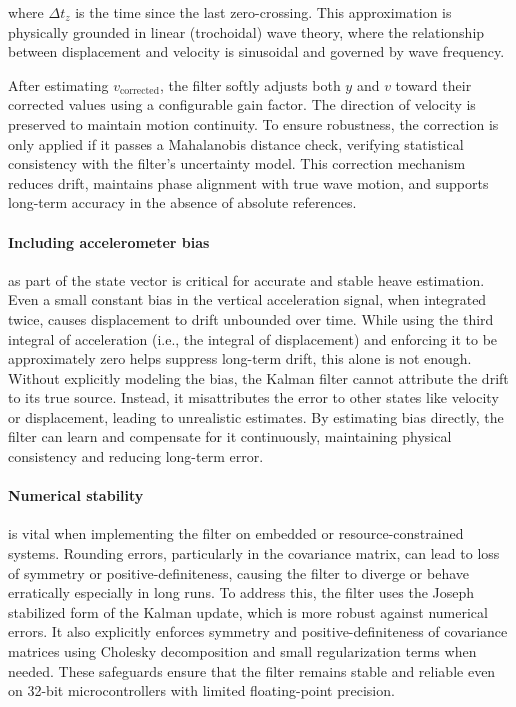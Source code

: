 \documentclass[11pt,letterpaper]{article}
\begin{document}
where \( \Delta t_{z} \) is the time since the last zero-crossing. This approximation is physically grounded in linear (trochoidal) wave theory\cite{Clamond2007,Gerstner1809}, where the relationship between displacement and velocity is sinusoidal and governed by wave frequency.

After estimating \( v_{\text{corrected}} \), the filter softly adjusts both \( y \) and \( v \) toward their corrected values using a configurable gain factor. The direction of velocity is preserved to maintain motion continuity. To ensure robustness, the correction is only applied if it passes a Mahalanobis distance check, verifying statistical consistency with the filter's uncertainty model. This correction mechanism reduces drift, maintains phase alignment with true wave motion, and supports long-term accuracy in the absence of absolute references.

\paragraph{Including accelerometer bias}
as part of the state vector is critical for accurate and stable heave estimation. Even a small constant bias in the vertical acceleration signal, when integrated twice, causes displacement to drift unbounded over time. While using the third integral of acceleration (i.e., the integral of displacement) and enforcing it to be approximately zero helps suppress long-term drift, this alone is not enough. Without explicitly modeling the bias, the Kalman filter cannot attribute the drift to its true source. Instead, it misattributes the error to other states like velocity or displacement, leading to unrealistic estimates. By estimating bias directly, the filter can learn and compensate for it continuously, maintaining physical consistency and reducing long-term error.

\paragraph{Numerical stability}
is vital when implementing the filter on embedded or resource-constrained systems. Rounding errors, particularly in the covariance matrix, can lead to loss of symmetry or positive-definiteness, causing the filter to diverge or behave erratically especially in long runs. To address this, the filter uses the Joseph\cite{grewal2014kalman} stabilized form of the Kalman update, which is more robust against numerical errors. It also explicitly enforces symmetry and positive-definiteness of covariance matrices using Cholesky decomposition and small regularization terms when needed. These safeguards ensure that the filter remains stable and reliable even on 32-bit microcontrollers with limited floating-point precision.
\end{document}
